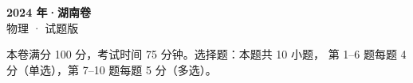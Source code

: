 \documentclass[zihao=-4, a4paper]{ctexart}
\begin{document}
\begin{center}
  {\Large\bfseries 2024 年·湖南卷}\\[4pt]
  {\large 物理 · 试题版}
\end{center}
\medskip
\begin{gknotice}
  本卷满分 100 分，考试时间 75 分钟。选择题：本题共 10 小题，
  第 1--6 题每题 4 分（单选），第 7--10 题每题 5 分（多选）。
\end{gknotice}

\end{document}
